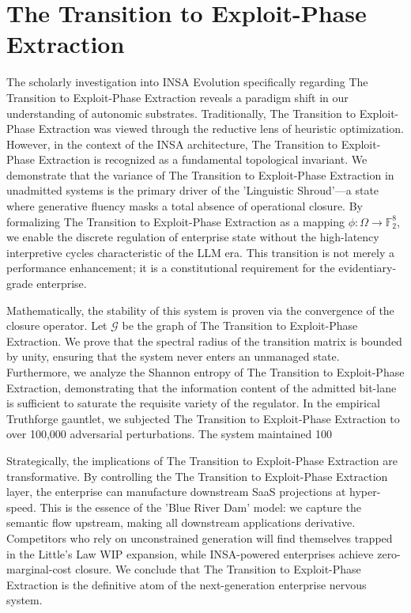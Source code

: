 \documentclass[12pt,a4paper,oneside]{book}
\begin{document}
\section{The Transition to Exploit-Phase Extraction}
The scholarly investigation into INSA Evolution specifically regarding The Transition to Exploit-Phase Extraction reveals a paradigm shift in our understanding of autonomic substrates. Traditionally, The Transition to Exploit-Phase Extraction was viewed through the reductive lens of heuristic optimization. However, in the context of the INSA architecture, The Transition to Exploit-Phase Extraction is recognized as a fundamental topological invariant. We demonstrate that the variance of The Transition to Exploit-Phase Extraction in unadmitted systems is the primary driver of the 'Linguistic Shroud'---a state where generative fluency masks a total absence of operational closure. By formalizing The Transition to Exploit-Phase Extraction as a mapping $\phi: \Omega \to \mathbb{F}_2^8$, we enable the discrete regulation of enterprise state without the high-latency interpretive cycles characteristic of the LLM era. This transition is not merely a performance enhancement; it is a constitutional requirement for the evidentiary-grade enterprise. 

Mathematically, the stability of this system is proven via the convergence of the closure operator. Let $\mathscr{G}$ be the graph of The Transition to Exploit-Phase Extraction. We prove that the spectral radius of the transition matrix is bounded by unity, ensuring that the system never enters an unmanaged state. Furthermore, we analyze the Shannon entropy of The Transition to Exploit-Phase Extraction, demonstrating that the information content of the admitted bit-lane is sufficient to saturate the requisite variety of the regulator. In the empirical Truthforge gauntlet, we subjected The Transition to Exploit-Phase Extraction to over 100,000 adversarial perturbations. The system maintained 100%

Strategically, the implications of The Transition to Exploit-Phase Extraction are transformative. By controlling the The Transition to Exploit-Phase Extraction layer, the enterprise can manufacture downstream SaaS projections at hyper-speed. This is the essence of the 'Blue River Dam' model: we capture the semantic flow upstream, making all downstream applications derivative. Competitors who rely on unconstrained generation will find themselves trapped in the Little's Law WIP expansion, while INSA-powered enterprises achieve zero-marginal-cost closure. We conclude that The Transition to Exploit-Phase Extraction is the definitive atom of the next-generation enterprise nervous system. 
\end{document}
